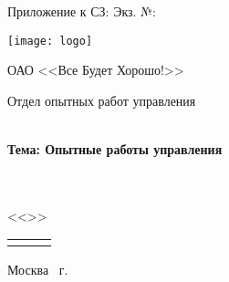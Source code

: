 \newcommand{\названиеКомпании}
{ОАО <<Все Будет Хорошо!>> 
	
	 Отдел опытных работ управления}
\begin{titlepage}
\thisfancypage{%
\setlength{\fboxsep}{2pt}\fbox}{}
Приложение к СЗ:   \hfill Экз. №: \underline{\hspace{2cm}} \\

\begin{center}
\texttt{[image: logo]} \\
{\large \названиеКомпании}
\vspace{4cm}\\
{\textbf{\large Тема: Опытные работы управления}} \\
\vspace{0.5cm}
{\Large \textbf{}}\\
\vspace{0.5cm}

 \\
\vspace{0.5cm}
\Large << >> \\
\vfill
\makeatletter
{
\renewcommand{\arraystretch}{3}
\begin{tabular}{R{.45\textwidth}cL{.45\textwidth}}%
	 & & \@author \\ 
\end{tabular} 
}
\makeatother
\vfill

Москва \the\year ~г.
\end{center}

\restoregeometry
\end{titlepage}